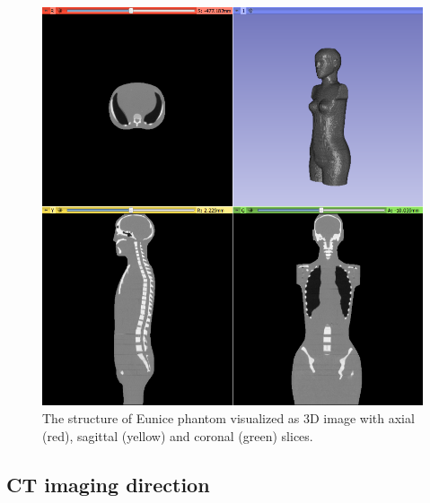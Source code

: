\documentclass[fleqn,10pt]{SelfArx} %
\begin{document}
\begin{figure}[ht]\centering
\includegraphics[width=0.9\linewidth]{Eunice}
\caption{The structure of Eunice phantom visualized as 3D image with axial (red), sagittal (yellow) and coronal (green) slices.}
\label{fig:EunicePhantom}
\end{figure}








\subsection{CT imaging direction}
\end{document}
